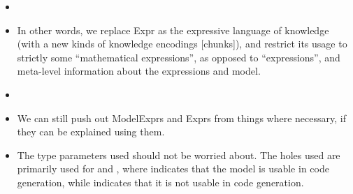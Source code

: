 \begin{itemize}
\begin{itemize}
		      \item \currentModelKindsHaskell{}

		      \item In other words, we replace Expr as the expressive language
		            of knowledge (with a new kinds of knowledge encodings
			            [chunks]), and restrict its usage to strictly some
		            ``mathematical expressions'', as opposed to ``expressions'',
		            and meta-level information about the expressions and model.

		      \item {}

		      \item We can still push out ModelExprs and Exprs from things where
		            necessary, if they can be explained using them.

		      \item The type parameters used should not be worried about. The
		            holes used are primarily used for \Expr{} and \ModelExpr{},
		            where \Expr{} indicates that the model is usable in code
		            generation, while \ModelExpr{} indicates that it is not
		            usable in code generation.

	      \end{itemize}

\end{itemize}


